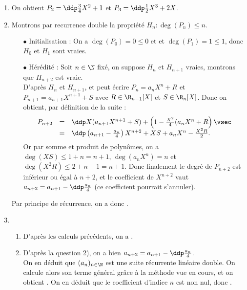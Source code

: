 \documentclass[a4paper, 11pt,reqno]{article}
\begin{document}
\begin{correction}  \;
	\begin{enumerate}
		\item On obtient $P_2=\ddp \frac{3}{4} X^2 +1$ et $P_3=\ddp \frac{1}{2} X^3 + 2X$.
		\item Montrons par r\?ecurrence double la propri\'et\'e $H_n : \deg(P_n)\leq n$.
		      \begin{itemize}
			      \item[$\bullet$] Initialisation : On a $\deg(P_0)=0\leq 0$ et et $\deg(P_1)=1\leq 1$, donc $H_0$ et $H_1$ sont vraies.
			      \item[$\bullet$] H\'er\'edit\'e : Soit $n \in \N$ fix\'e, on suppose $H_n$ et $H_{n+1}$ vraies, montrons que $H_{n+2}$ est vraie.\\
			            D'apr\`es  $H_n$ et $H_{n+1}$, et peut \'ecrire $P_n= a_n X^n + R$ et $P_{n+1}=a_{n+1} X^{n+1} + S$ avec $R\in \R_{n-1}[X]$ et $S \in \R_{n}[X]$. Donc on obtient, par d\'efinition de la suite :
			            $$\begin{array}{rcl}
					            P_{n+2} & = & \ddp X(a_{n+1} X^{n+1} + S) + \left(1-\frac{X^2}{4} (a_{n} X^{n}+R\right)\vsec      \\
					                    & = & \ddp \left(a_{n+1} - \frac{a_n}{4} \right) X^{n+2} + XS +a_n X^n - \frac{X^2 R}{2}.
				            \end{array}$$
			            Or par somme et produit de polyn\^omes, on a $\deg(XS)\leq 1+n=n+1$, $\deg(a_n X^n)=n$ et $\deg(X^2R)\leq 2+n-1=n+1$. Donc finalement le degr\'e de $P_{n+2}$ est inf\'erieur ou \'egal \`a $n+2$, et le coefficient de $X^{n+2}$ vaut $a_{n+2} = a_{n+1} - \ddp \frac{a_n}{4}$ (ce coefficient pourrait s'annuler).
		      \end{itemize}
		      Par principe de r\'ecurrence, on a donc .
		\item
		      \begin{enumerate}
			      \item D'apr\`es les calculs pr\'ec\'edents, on a .
			      \item D'apr\`es la question 2), on a bien $a_{n+2} = a_{n+1} - \ddp \frac{a_n}{4}$.\\
			            On en d\'eduit que $(a_n)_{n\in \N}$ est une suite r\'ecurrente lin\'eaire double. On calcule alors son terme g\'en\'eral gr\^ace \`a la m\'ethode vue en cours, et on obtient . On en d\'eduit que le coefficient d'indice $n$ est non nul, donc .
		      \end{enumerate}
	\end{enumerate}
\end{correction}
\end{document}
